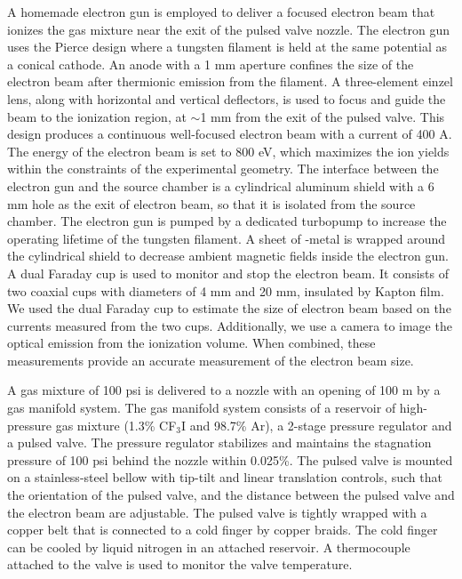 \documentclass[%
aip,
rsi,
 amsmath,amssymb,
reprint,%
]{revtex4-1}
\begin{document}
A homemade electron gun is employed to deliver a focused electron beam that ionizes the gas mixture near the exit of the pulsed valve nozzle. The electron gun uses the Pierce design where a tungsten filament is held at the same potential as a conical cathode\cite{pierce_rectilinear_1940}. An anode with a 1 mm aperture confines the size of the electron beam after thermionic emission from the filament. A three-element einzel lens, along with horizontal and vertical deflectors, is used to focus and guide the beam to the ionization region, at $\sim$1 mm from the exit of the pulsed valve. This design produces a continuous well-focused electron beam with a current of 400 {\textmu}A. The energy of the electron beam is set to 800 eV, which maximizes the ion yields within the constraints of the experimental geometry. The interface between the electron gun and the source chamber is a cylindrical aluminum shield with a 6 mm hole as the exit of electron beam, so that it is isolated from the source chamber. The electron gun is pumped by a dedicated turbopump to increase the operating lifetime of the tungsten filament. A sheet of {\textmu}-metal is wrapped around the cylindrical shield to decrease ambient magnetic fields inside the electron gun. A dual Faraday cup is used to monitor and stop the electron beam. It consists of two coaxial cups with diameters of 4 mm and 20 mm, insulated by Kapton film. We used the dual Faraday cup to estimate the size of electron beam based on the currents measured from the two cups. Additionally, we use a camera to image the optical emission from the ionization volume. When combined, these measurements provide an accurate measurement of the electron beam size.  

A gas mixture of 100 psi is delivered to a nozzle with an opening of 100 {\textmu}m by a gas manifold system. The gas manifold system consists of a reservoir of high-pressure gas mixture (1.3\% CF$_3$I and 98.7\% Ar), a 2-stage pressure regulator and a pulsed valve. The pressure regulator stabilizes and maintains the stagnation pressure of 100 psi behind the nozzle within 0.025\%. The pulsed valve is mounted on a stainless-steel bellow with tip-tilt and linear translation controls, such that the orientation of the pulsed valve, and the distance between the pulsed valve and the electron beam are adjustable. The pulsed valve is tightly wrapped with a copper belt that is connected to a cold finger by copper braids. The cold finger can be cooled by liquid nitrogen in an attached reservoir. A thermocouple attached to the valve is used to monitor the valve temperature.
\end{document}
